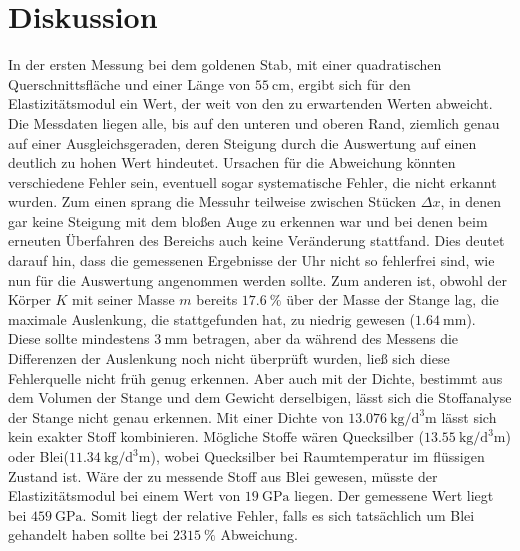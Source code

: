 \section{Diskussion}
\label{sec:Diskussion}

In der ersten Messung bei dem goldenen Stab, mit einer quadratischen Querschnittsfläche und einer Länge von $\SI{55}{\centi\meter}$, ergibt sich für den Elastizitätsmodul ein Wert, der weit von den zu erwartenden Werten abweicht. Die Messdaten liegen alle, bis auf den unteren und oberen Rand, ziemlich genau auf einer Ausgleichsgeraden, deren Steigung durch die Auswertung auf einen deutlich zu hohen Wert hindeutet. Ursachen für die Abweichung könnten verschiedene Fehler sein, eventuell sogar systematische Fehler, die nicht erkannt wurden. Zum einen sprang die Messuhr teilweise zwischen Stücken $ \Delta x$, in denen gar keine Steigung mit dem bloßen Auge zu erkennen war und bei denen beim erneuten Überfahren des Bereichs auch keine Veränderung stattfand. Dies deutet darauf hin, dass die gemessenen Ergebnisse der Uhr nicht so fehlerfrei sind, wie nun für die Auswertung angenommen werden sollte. 
Zum anderen ist, obwohl der Körper $K$ mit seiner Masse $m$ bereits $\SI{17.6}{\percent}$ über der Masse der Stange lag, die maximale Auslenkung, die stattgefunden hat, zu niedrig gewesen ($\SI{1.64}{\milli\meter}$). Diese sollte mindestens $\SI{3}{\milli\meter}$ betragen, aber da während des Messens die Differenzen der Auslenkung noch nicht überprüft wurden, ließ sich diese Fehlerquelle nicht früh genug erkennen. 
Aber auch mit der Dichte, bestimmt aus dem Volumen der Stange und dem Gewicht derselbigen, lässt sich die Stoffanalyse der Stange nicht genau erkennen. Mit einer Dichte von $\SI{13,076}{\kilo\gram\per\cubic\deci\meter}$ lässt sich kein exakter Stoff kombinieren. Mögliche Stoffe wären Quecksilber ($\SI{13,55}{\kilo\gram\per\cubic\deci\meter}$) oder Blei($\SI{11,34}{\kilo\gram\per\cubic\deci\meter}$), wobei Quecksilber bei Raumtemperatur im flüssigen Zustand ist. Wäre der zu messende Stoff aus Blei gewesen, müsste der Elastizitätsmodul bei einem Wert von $\SI{19}{\giga\pascal}$ liegen. Der gemessene Wert liegt bei $\SI{459}{\giga\pascal}$. Somit liegt der relative Fehler, falls es sich tatsächlich um Blei gehandelt haben sollte bei $\SI{2315}{\percent}$ Abweichung. 


